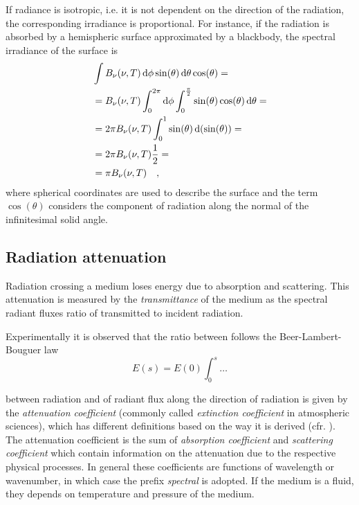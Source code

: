 \documentclass[a4paper,10pt,twocolumn,\classoptions]{article}
\begin{document}
If radiance is isotropic, i.e. it is not dependent on the direction of the radiation, the corresponding irradiance is proportional. For instance, if the radiation is absorbed by a hemispheric surface approximated by a blackbody, the spectral irradiance of the surface is
\begin{equation}
  \label{eq:spectral_irradiance_blackbody_hemisphere}
  \begin{split}
    & \int B_\nu (\nu, T) \odif{\phi} \sin(\theta) \odif{\theta} \cos(\theta) = \\
    & = B_\nu (\nu, T) \int_0^{2\pi} \odif{\phi} \int_0^\frac{\pi}{2} \sin(\theta) \cos(\theta) \odif{\theta} = \\
    & = 2 \pi B_\nu (\nu, T) \int_0^1 \sin(\theta) \odif{(\sin(\theta))} = \\
    & = 2 \pi B_\nu (\nu, T) \frac{1}{2} = \\
    & = \pi B_\nu (\nu, T)
    \quad ,
  \end{split}
\end{equation}
where spherical coordinates are used to describe the surface and the term $\cos(\theta)$ considers the component of radiation along the normal of the infinitesimal solid angle.



\subsection{Radiation attenuation}
\label{sec:Radiation attenuation}
Radiation crossing a medium loses energy due to absorption and scattering. This attenuation is measured by the \emph{transmittance} of the medium as the spectral radiant fluxes ratio of transmitted to incident radiation.

Experimentally it is observed that the ratio between follows the Beer-Lambert-Bouguer law
\begin{equation}
  \label{eq:extinction_law}
  E(s) = E(0) \int_0^s \dots
\end{equation}

between radiation and  of radiant flux along the direction of radiation is given by the \emph{attenuation coefficient} (commonly called \emph{extinction coefficient} in atmospheric sciences), which has different definitions based on the way it is derived (cfr. \cite[44]{Catling}). The attenuation coefficient is the sum of \emph{absorption coefficient} and \emph{scattering coefficient} which contain information on the attenuation due to the respective physical processes.
In general these coefficients are functions of wavelength or wavenumber, in which case the prefix \emph{spectral} is adopted. If the medium is a fluid, they depends on temperature and pressure of the medium.
\end{document}
